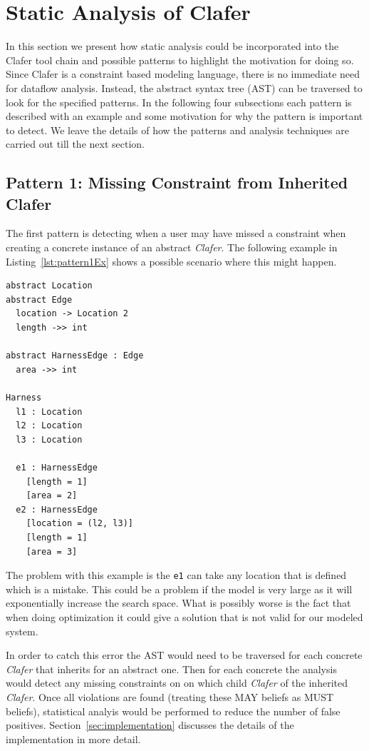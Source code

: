 \documentclass[10pt,oneside]{IEEEtran}
\begin{document}
\section{Static Analysis of Clafer}
In this section we present how static analysis could be incorporated into the Clafer tool chain and possible patterns to highlight the motivation for doing so. Since Clafer is a constraint based modeling language, there is no immediate need for dataflow analysis. Instead, the abstract syntax tree (AST) can be traversed to look for the specified patterns. In the following four subsections each pattern is described with an example and some motivation for why the pattern is important to detect. We leave the details of how the patterns and analysis techniques are carried out till the next section.%

\subsection{Pattern 1: Missing Constraint from Inherited Clafer}
The first pattern is detecting when a user may have missed a constraint when creating a concrete instance of an abstract \textit{Clafer}. The following example in Listing~\ref{lst:pattern1Ex} shows a possible scenario where this might happen.
\begin{lstlisting}[label={lst:pattern1Ex},caption={Example of Pattern 1}]
abstract Location
abstract Edge
  location -> Location 2
  length ->> int

abstract HarnessEdge : Edge
  area ->> int

Harness
  l1 : Location
  l2 : Location
  l3 : Location

  e1 : HarnessEdge
    [length = 1]
    [area = 2]
  e2 : HarnessEdge
    [location = (l2, l3)]
    [length = 1]
    [area = 3]
\end{lstlisting}
The problem with this example is the \lstinline$e1$ can take any location that is defined which is a mistake. This could be a problem if the model is very large as it will exponentially increase the search space. What is possibly worse is the fact that when doing optimization it could give a solution that is not valid for our modeled system.

In order to catch this error the AST would need to be traversed for each concrete \textit{Clafer} that inherits for an abstract one. Then for each concrete the analysis would detect any missing constraints on on which child \textit{Clafer} of the inherited \textit{Clafer}. Once all violations are found (treating these MAY beliefs as MUST beliefs), statistical analyis would be performed to reduce the number of false positives. Section~\ref{sec:implementation} discusses the details of the implementation in more detail.
\end{document}

